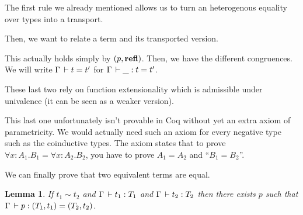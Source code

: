\documentclass[11pt]{article}
\theoremstyle{plain}
\newtheorem{lemma}[theorem]{Lemma}
\theoremstyle{remark}
\begin{document}
The first rule we already mentioned allows us to turn an heterogenous equality
over types into a transport.
\begin{mathc}
\end{mathc}
Then, we want to relate a term and its transported version.
\begin{mathc}
\end{mathc}
This actually holds simply by $(p,\operatorname{\mathbf{refl}})$.
Then, we have the different congruences.
We will write $\Gamma \,\vdash t = t'$ for $\Gamma \,\vdash \_ : t = t'$.
\begin{mathc}
\end{mathc}
\begin{mathc}
\end{mathc}
These last two rely on function extensionality which is admissible under
univalence (it can be seen as a weaker version).
\begin{mathc}
\end{mathc}
This last one unfortunately isn't provable in Coq without yet an extra axiom
of parametricity. We would actually need such an axiom for every negative
type such as the coinductive types. The axiom states that to prove
$\forall x:A_1.B_1 = \forall x:A_2.B_2$, you have to prove $A_1 = A_2$
and ``$B_1 = B_2$''.

We can finally prove that two equivalent terms are equal.

\begin{lemma}
  If $t_1 \sim t_2$ and $\Gamma \,\vdash t_1 : T_1$ and $\Gamma \,\vdash t_2 : T_2$
  then there exists $p$ such that $\Gamma \,\vdash p : (T_1,t_1) = (T_2,t_2)$.
\end{lemma}
\end{document}
